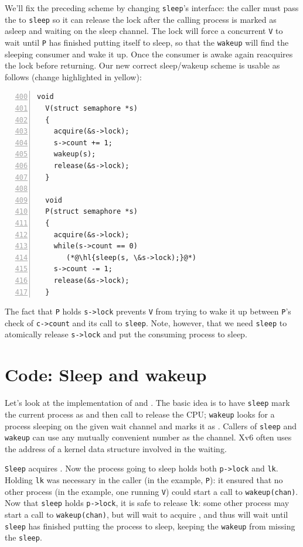 We'll fix the preceding scheme by changing
\lstinline{sleep}'s
interface:
the caller must pass the  to
\lstinline{sleep}
so it can release the lock after
the calling process is marked as asleep and waiting on the
sleep channel.
The lock will force a concurrent
\lstinline{V}
to wait until \lstinline{P} has finished putting itself to sleep,
so that the
\lstinline{wakeup}
will find the sleeping consumer and wake it up.
Once the consumer is awake again
reacquires the lock before returning.
Our new correct sleep/wakeup scheme is usable as follows (change
highlighted in yellow):
\begin{lstlisting}[numbers=left,firstnumber=400]
  void
  V(struct semaphore *s)
  {
    acquire(&s->lock);
    s->count += 1;
    wakeup(s);
    release(&s->lock);
  }

  void
  P(struct semaphore *s)
  {
    acquire(&s->lock);
    while(s->count == 0)
       (*@\hl{sleep(s, \&s->lock);}@*)
    s->count -= 1;
    release(&s->lock);
  }
\end{lstlisting}

The fact that
\lstinline{P}
holds
\lstinline{s->lock}
prevents 
\lstinline{V}
from trying to wake it up between 
\lstinline{P}'s
check of
\lstinline{c->count}
and its call to
\lstinline{sleep}.
Note, however, that we need
\lstinline{sleep}
to atomically release
\lstinline{s->lock}
and put the consuming process to sleep.

\section{Code: Sleep and wakeup}

Let's look at the implementation of
and
.
The basic idea is to have
\lstinline{sleep}
mark the current process as
and then call
to release the CPU;
\lstinline{wakeup}
looks for a process sleeping on the given wait channel
and marks it as 
.
Callers of
\lstinline{sleep}
and
\lstinline{wakeup}
can use any mutually convenient number as the channel.
Xv6 often uses the address
of a kernel data structure involved in the waiting.

\lstinline{Sleep}
acquires 
.
Now the process going to sleep holds both
\lstinline{p->lock}
and
\lstinline{lk}.
Holding
\lstinline{lk}
was necessary in the caller (in the example,
\lstinline{P}):
it
ensured that no other process (in the example,
one running
\lstinline{V})
could start a call to
\lstinline{wakeup(chan)}.
Now that
\lstinline{sleep}
holds
\lstinline{p->lock},
it is safe to release
\lstinline{lk}:
some other process may start a call to
\lstinline{wakeup(chan)},
but
will wait to acquire
,
and thus will wait until
\lstinline{sleep}
has finished putting the process to sleep,
keeping the
\lstinline{wakeup}
from missing the
\lstinline{sleep}.

